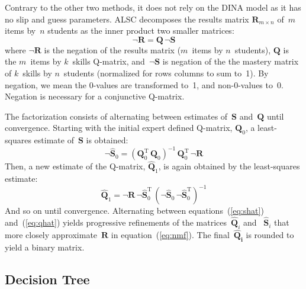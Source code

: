 \documentclass{edm_template}
\begin{document}
Contrary to the other two methods, it does not rely on the DINA model as it has no slip and guess parameters.  ALSC decomposes the results matrix $\mathbf{R}_{m \times n}$ of~$m$ items by~$n$ students as the inner product two smaller matrices:
\begin{equation}
  \mathbf{\neg {R}} = \mathbf{Q} \, \neg \mathbf{S} \label{eq:nmf}
\end{equation}
where $\neg \mathbf{R}$ is the negation of the results matrix ($m$~items by $n$~students),  $\mathbf{Q}$ is the $m$~items by $k$~skills Q-matrix, and~$\neg \mathbf{S}$ is negation of the the mastery matrix of $k$~skills by $n$~students (normalized for rows columns to sum to~1).  By negation, we mean the 0-values are transformed to~1, and non-0-values to~0.  Negation is necessary for a conjunctive Q-matrix.

The factorization consists of alternating between estimates of~$\mathbf{S}$ and~$\mathbf{Q}$ until convergence.  Starting with the initial expert defined Q-matrix, $\mathbf{{Q}}_0$, a least-squares estimate of~$\mathbf{S}$ is obtained:
\begin{equation}
  \neg \mathbf{\hat{S}}_0 = (\mathbf{Q}_0^{\mathrm{T}}  \, \mathbf{Q}_0)^{-1} \, \mathbf{Q}_0^{\mathrm{T}} \, \neg \mathbf{R} \label{eq:shat}
\end{equation}
Then, a new estimate of the Q-matrix, $\mathbf{\hat{Q}}_1$, is again obtained by the least-squares estimate:
\begin{equation}
  \mathbf{\hat{Q}}_1 = \neg \mathbf{R} \, \neg \mathbf{\hat{S}}_0^{\mathrm{T}} \, (\neg \mathbf{\hat{S}}_0 \, \neg \mathbf{\hat{S}}_0^{\mathrm{T}})^{-1} \label{eq:qhat}
\end{equation}
And so on until convergence.  Alternating between equations~(\ref{eq:shat}) and~(\ref{eq:qhat}) yields progressive refinements of the matrices~$\mathbf{\hat{Q}}_i$ and ~$\mathbf{\hat{S}}_i$ that more closely approximate~$\mathbf{R}$ in equation~(\ref{eq:nmf}).  The final~$\mathbf{\hat{Q}_i}$ is rounded to yield a binary matrix.

\subsection{Decision Tree}

\end{document}
